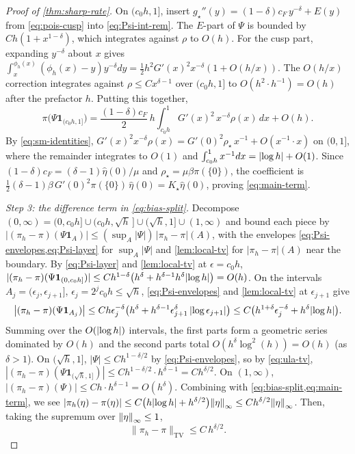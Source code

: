 \documentclass[aap,preprint]{imsart}
\DeclarePairedDelimiter{\Vpair}{\|}{\|} %
\DeclarePairedDelimiter{\vpair}{|}{|} %
\newcommand\norm[2][0pt]{\Vpair*{#2}} %
\newcommand\snorm[1]{\norm{\smash{#1}}} %
\newcommand\abs[2][0pt]{\vpair*{#2}} %
\numberwithin{equation}{section}
\theoremstyle{plain}
\theoremstyle{definition}
\begin{document}
\begin{proof}[Proof of \cref{thm:sharp-rate}]
  On $(c_0h,1]$, insert $g_\star''(y)=(1-\delta)c_F\,y^{-\delta}+E(y)$ from \cref{eq:pois-cusp} into \cref{eq:Psi-int-rem}.  The $E$-part of $\Psi$ is bounded by $Ch(1+x^{1-\delta})$, which integrates against $\rho$ to $O(h)$.  For the cusp part, expanding $y^{-\delta}$ about $x$ gives $\int_x^{\phi_h(x)}(\phi_h(x)-y)y^{-\delta}dy=\tfrac12h^2G'(x)^2x^{-\delta}(1+O(h/x))$. The $O(h/x)$ correction integrates against $\rho\le C x^{\delta-1}$ over $(c_0h,1]$ to $O(h^2\cdot h^{-1})=O(h)$ after the prefactor $h$. Putting this together,
  \[
    \pi\bigl(\Psi\mathbf 1_{(c_0h,1]}\bigr)
    =\frac{(1-\delta)c_F}{2}\,h\int_{c_0h}^1G'(x)^2\,x^{-\delta}\rho(x)\,dx+O(h).
  \]
  By \cref{eq:sm-identities}, $G'(x)^2x^{-\delta}\rho(x)=G'(0)^2\rho_\star\,x^{-1}+O(x^{-1}\cdot x)$ on $(0,1]$, where the remainder integrates to $O(1)$ and $\int_{c_0h}^1x^{-1}dx=\abs{\log h } +O(1)$.  Since $(1-\delta)c_F=(\delta-1)\hat\eta(0)/\mu$ and $\rho_\star=\mu\beta\pi(\{0\})$, the coefficient is
  $\tfrac12(\delta-1)\beta\,G'(0)^2\pi(\{0\})\,\hat\eta(0)=K_\star\hat\eta(0)$, proving \cref{eq:main-term}.

  \emph{Step 3: the difference term in \cref{eq:bias-split}.}  Decompose $(0,\infty)=(0,c_0h]\cup(c_0h,\sqrt h\,]\cup(\sqrt h,1]\cup(1,\infty)$ and bound each piece by $|(\pi_h-\pi)(\Psi\mathbf 1_A)|\le(\sup_A|\Psi|)\,|\pi_h-\pi|(A)$, with the envelopes \cref{eq:Psi-envelopes,eq:Psi-layer} for $\sup_A|\Psi|$ and \cref{lem:local-tv} for $|\pi_h-\pi|(A)$ near the boundary.
  By \cref{eq:Psi-layer} and \cref{lem:local-tv} at $\epsilon=c_0h$,
  $|(\pi_h-\pi)(\Psi\mathbf 1_{(0,c_0h]})|\le Ch^{1-\delta}\bigl(h^\delta+h^{\delta-1}h^\delta\abs{\log h } \bigr)=O(h)$.
  On the intervals $A_j=(\epsilon_j,\epsilon_{j+1}]$, $\epsilon_j=2^jc_0h\le\sqrt h$, \cref{eq:Psi-envelopes} and \cref{lem:local-tv} at $\epsilon_{j+1}$ give
  \[
    \bigl|(\pi_h-\pi)(\Psi\mathbf 1_{A_j})\bigr|
    \le Ch\epsilon_j^{-\delta}\bigl(h^\delta+h^{\delta-1}\epsilon_{j+1}^\delta\,\lvert\log\epsilon_{j+1}\rvert\bigr)
    \le C\bigl(h^{1+\delta}\epsilon_j^{-\delta}+h^\delta\abs{\log h } \bigr).
  \]
  Summing over the $O(\abs{\log h } )$ intervals, the first parts form a geometric series dominated by $O(h)$ and the second parts total $O(h^\delta\log^2(h))=O(h)$ (as $\delta>1$).
  On $(\sqrt h,1]$, $|\Psi|\le Ch^{1-\delta/2}$ by \cref{eq:Psi-envelopes}, so by \cref{eq:ula-tv},
  $|(\pi_h-\pi)(\Psi\mathbf 1_{(\sqrt h,1]})|\le Ch^{1-\delta/2}\cdot h^{\delta-1}=Ch^{\delta/2}$.
  On $(1,\infty)$, $|(\pi_h-\pi)(\Psi)|\le Ch\cdot h^{\delta-1}=O(h^\delta)$.
  Combining with \cref{eq:bias-split,eq:main-term}, we see $|\pi_h(\eta)-\pi(\eta)|\le C\bigl(h\abs{\log h } +h^{\delta/2}\bigr)\snorm{\eta}_\infty\le Ch^{\delta/2}\snorm{\eta}_\infty$. Then, taking the supremum over $\snorm{\eta}_\infty\le1$,
  \begin{equation}\label{eq:tv-boot}
    \|\pi_h-\pi\|_{\mathrm{TV}}\le C\,h^{\delta/2}.
  \end{equation}


\end{proof}
\end{document}

